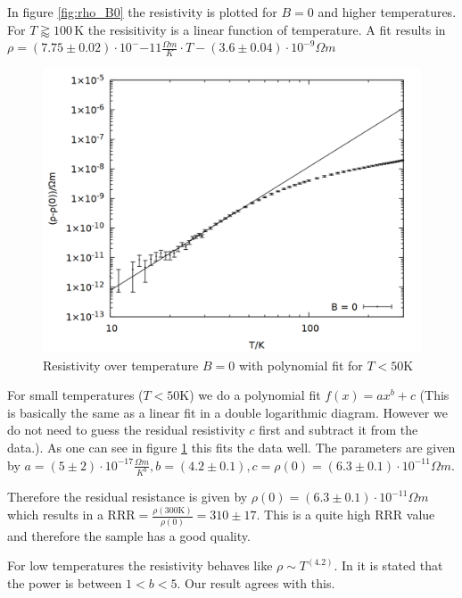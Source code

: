 In figure \ref{fig:rho_B0} the resistivity is plotted for $B = 0$ and higher temperatures. For $T \gtrapprox 100\,\si{\kelvin}$ the resisitivity is a linear function of temperature. A fit results in $\rho = (7.75 \pm 0.02)\cdot 10^-{-11} \si{\frac{\Omega m}{K}} \cdot T - (3.6 \pm 0.04) \cdot 10^{-9} \si{\Omega m}$

\begin{figure}
    \centering
    \includegraphics[width=0.7\linewidth]{data/rho_B0_fit.png}
    \caption{Resistivity over temperature $B = 0$ with polynomial fit for $T < 50\si{\kelvin}$}
    \label{fig:rho_B0_fit}
\end{figure}

For small temperatures ($T < 50 \si{\kelvin}$) we do a polynomial fit $f(x) = ax^b + c$ (This is basically the same as a linear fit in a double logarithmic diagram. However we do not need to guess the residual resistivity $c$ first and subtract it from the data.). As one can see in figure \ref{fig:rho_B0_fit} this fits the data well. The parameters are given by $a = (5 \pm 2) \cdot 10^{-17} \si{\frac{\Omega m}{K^b}}, b = (4.2 \pm 0.1), c = \rho(0) = (6.3 \pm 0.1) \cdot 10^{-11} \si{\Omega m}$.

Therefore the residual resistance is given by $\rho(0) = (6.3 \pm 0.1) \cdot 10^{-11} \si{\Omega m}$ which results in a $\mathrm{RRR} = \frac{\rho(300 \si{\kelvin})}{\rho(0)} = 310 \pm 17$. This is a quite high RRR value and therefore the sample has a good quality.

For low temperatures the resistivity behaves like $\rho \sim T^(4.2)$. In \cite{rho_low_temp} it is stated that the power is between $1 < b < 5$. Our result agrees with this.

